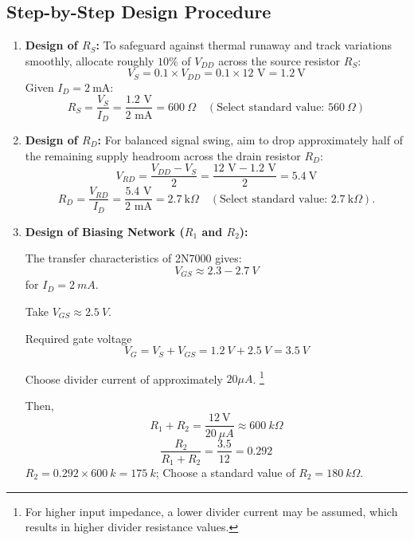 \subsection{Step-by-Step Design Procedure}
\begin{enumerate}
	\item \textbf{Design of $R_S$:} To safeguard against thermal runaway and track variations smoothly, allocate roughly $10\%$ of $V_{DD}$ across the source resistor $R_S$:
	\begin{equation}
		V_S = 0.1 \times V_{DD} = 0.1 \times 12\text{ V} = \SI{1.2}{\volt}
	\end{equation}
	Given $I_D = \SI{2}{\milli\ampere}$:
	\begin{equation}
		R_S = \frac{V_S}{I_D} = \frac{1.2\text{ V}}{2\text{ mA}} = \SI{600}{\Omega} \quad (\text{Select standard value: } \SI{560}{\Omega})
	\end{equation}
	
	\item \textbf{Design of $R_D$:} For balanced signal swing, aim to drop approximately half of the remaining supply headroom across the drain resistor $R_D$:
	\begin{equation}
		V_{RD} = \frac{V_{DD} - V_S}{2} = \frac{12\text{ V} - 1.2\text{ V}}{2} = \SI{5.4}{\volt}
	\end{equation}
	\begin{equation}
		R_D = \frac{V_{RD}}{I_D} = \frac{5.4\text{ V}}{2\text{ mA}} = \SI{2.7}{\kilo\Omega} \quad (\text{Select standard value: } \SI{2.7}{\kilo\Omega}).
	\end{equation}
	
	\item \textbf{Design of Biasing Network ($R_1$ and $R_2$):}
	
	The transfer characteristics of 2N7000 gives:
	\[
	V_{GS}\approx 2.3-2.7\ V
	\]
	for $I_D= 2\ mA$.
	
	Take $V_{GS}\approx 2.5\ V$.
	
	Required gate voltage 
	\[
	V_G=V_S+V_{GS} = 1.2 \ V+2.5\ V = 3.5 \ V
	\]
	
	Choose divider current of approximately $20\mu A$. \footnote{For higher input impedance, a lower divider current may be assumed, which results in higher divider resistance values.}
	
	Then, 
	\[
	R_1+R_2 = \dfrac{12\ \text{V}}{20\ \mu A} \approx 600\ k\Omega
	\]
	\[
	\dfrac{R_2}{R_1+R_2}= \dfrac{3.5}{12} = 0.292
	\]
	$R_2=0.292\times600\  k = 175\ k$; Choose a standard value of $R_2=180\ k\Omega$.
	

\end{enumerate}
